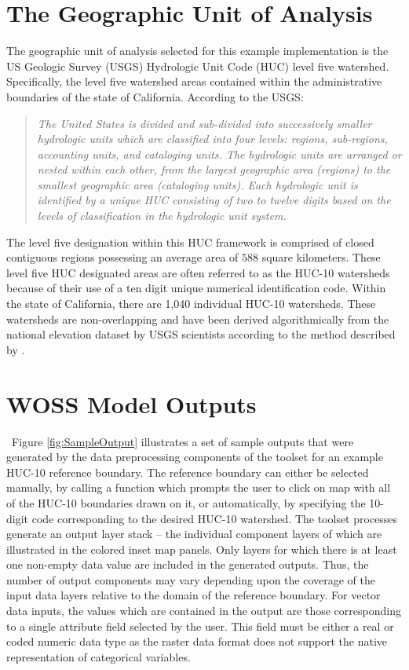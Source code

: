 \section{The Geographic Unit of Analysis}
    
    The geographic unit of analysis selected for this example implementation is the US Geologic Survey (USGS) Hydrologic Unit Code (HUC) level five watershed. Specifically, the level five watershed areas contained within the administrative boundaries of the state of California. According to the USGS: 
    \blockquote{\textit{The United States is divided and sub-divided into successively smaller hydrologic units which are classified into four levels: regions, sub-regions, accounting units, and cataloging units. The hydrologic units are arranged or nested within each other, from the largest geographic area (regions) to the smallest geographic area (cataloging units). Each hydrologic unit is identified by a unique HUC consisting of two to twelve digits based on the levels of classification in the hydrologic unit system. \cite{Seaber1987}}}
    The level five designation within this HUC framework is comprised of closed contiguous regions possessing an average area of $588$ square kilometers. These level five HUC designated areas are often referred to as the HUC-10 watersheds because of their use of a ten digit unique numerical identification code. Within the state of California, there are 1,040 individual HUC-10 watersheds. These watersheds are non-overlapping and have been derived algorithmically from the national elevation dataset by USGS scientists according to the method described by \cite{Seaber1987}.
    
\section{WOSS Model Outputs}
    
    ~Figure \ref{fig:SampleOutput} illustrates a set of sample outputs that were generated by the data preprocessing components of the toolset for an example HUC-10 reference boundary. The reference boundary can either be selected manually, by calling a function which prompts the user to click on map with all of the HUC-10 boundaries drawn on it, or automatically, by specifying the 10-digit code corresponding to the desired HUC-10 watershed. The toolset processes generate an output layer stack -- the individual component layers of which are illustrated in the colored inset map panels. Only layers for which there is at least one non-empty data value are included in the generated outputs. Thus, the number of output components may vary depending upon the coverage of the input data layers relative to the domain of the reference boundary. For vector data inputs, the values which are contained in the output are those corresponding to a single attribute field selected by the user. This field must be either a real or coded numeric data type as the raster data format does not support the native representation of categorical variables.
    
